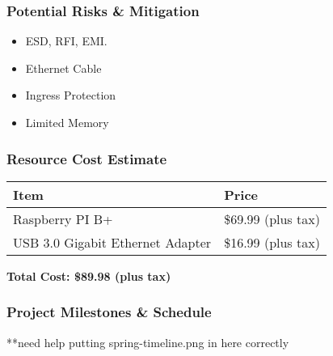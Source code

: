 \begin{frame}
\frametitle{Potential Risks \& Mitigation}



\begin{itemize}
    \item ESD, RFI, EMI.
    \item Ethernet Cable
    \item Ingress Protection
    \item Limited Memory
\end{itemize}

\end{frame}

\begin{frame}
\frametitle{Resource Cost Estimate}


\begin{center}
\begin{tabular}{l | l}
\toprule
\textbf{Item} & \textbf{Price} \\
\midrule
Raspberry PI B+ & \$69.99 (plus tax) \\
USB 3.0 Gigabit Ethernet Adapter & \$16.99 (plus tax) \\
\bottomrule
\end{tabular}

\hfill \break
\textbf{Total Cost: \$89.98 (plus tax)}
\end{center}


\end{frame}

\begin{frame}
\frametitle{Project Milestones \& Schedule}

**need help putting spring-timeline.png in here correctly

\end{frame}
